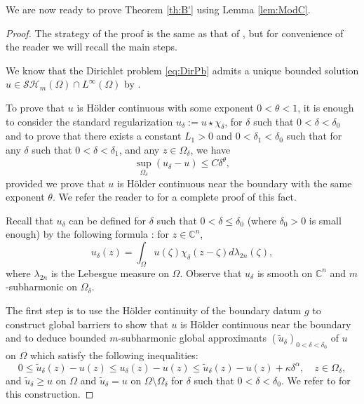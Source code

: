 \documentclass[JEP,XML,SOM,Unicode]{cedram}
\theoremstyle{definition}
\newcommand{\C}{\mathbb{C}}
\begin{document}
We are now ready to prove Theorem \ref{th:B'} using Lemma \ref{lem:ModC}.

\begin{proof} The strategy of the proof is the same as that of \cite[Th.\,B]{BZ20}, but for convenience of the reader we will recall the main steps.

We know that the Dirichlet problem \eqref{eq:DirPb} admits a unique bounded solution $u \in \mathcal{SH}_m (\Omega) \cap L^{\infty} (\Omega)$ by \cite{N13}.

To prove that $u$ is Hölder continuous with some exponent $0 < \theta < 1$, it is enough to consider the standard regularization $u_\delta := u \star \chi_\delta$, for $\delta$ such that $0 < \delta < \delta_0$ and to prove that there exists a constant $L_1 > 0$ and $0< \delta_1 < \delta_0$ such that for any $\delta$ such that $0 < \delta < \delta_1$, and any $z \in \Omega_\delta$, we have
\begin{equation} \label{eq:Holdercontinous}
\sup_{\Omega_\delta} (u_\delta - u) \leq C \delta^{\theta},
\end{equation}
provided we prove that $u$ is Hölder continuous near the boundary with the same exponent $\theta$. We refer the reader to \cite{Ze20} for a complete proof of this fact.

Recall that $u_\delta$ can be defined for $\delta$ such that $0 < \delta \leq \delta_0$ (where $\delta_0 >0$ is small enough) by the following formula : for $z \in \C^n$,
\[
u_\delta (z) = \int_{\Omega} u (\zeta) \chi_\delta (z-\zeta) d \lambda_{2 n} (\zeta),
\]
where $\lambda_{2 n}$ is the Lebesgue measure on $\Omega$.
Observe that $u_\delta $ is smooth on $\C^n$ and $m$-subharmonic on $\Omega_\delta$.

The first step is to use the Hölder continuity of the boundary datum $g$ to construct global barriers to show that $u$ is Hölder continuous near the boundary and to deduce bounded $m$-subharmonic global approximants $(\tilde u_\delta)_{0 < \delta < \delta_0}$ of $u$ on $\Omega$ which satisfy the following inequalities:
\begin{equation} \label{eq:bestapproximant}
0 \leq \tilde{u}_{\delta}(z) - u (z) \leq u_\delta (z) - u (z) \leq \tilde{u}_{\delta}(z) - u (z) + \kappa \delta^\alpha, \quad z\in \Omega_{\delta},
\end{equation}
and $ \tilde{u}_{\delta} \geq u$ on $ \Omega$ and $\tilde{u}_{\delta} = u$ on $\Omega \setminus \Omega_\delta$ for $\delta$ such that $0 < \delta < \delta_0$.
We refer to \cite{BZ20} for this construction.


\end{proof}
\end{document}
